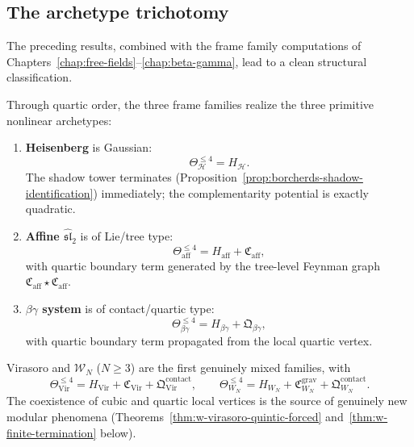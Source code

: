 \subsection{The archetype trichotomy}
\label{subsec:w-archetype-trichotomy}

The preceding results, combined with the frame family computations
of Chapters~\ref{chap:free-fields}--\ref{chap:beta-gamma},
lead to a clean structural classification.

\begin{theorem}
\label{thm:w-archetype-trichotomy}
Through quartic order, the three frame families realize the three
primitive nonlinear archetypes:
\begin{enumerate}[label=\textup{(\roman*)}]
\item \textbf{Heisenberg} is Gaussian:
\[
\Theta_{\mathcal H}^{\le 4}=H_{\mathcal H}.
\]
The shadow tower terminates
(Proposition~\ref{prop:borcherds-shadow-identification}) immediately; the complementarity potential
is exactly quadratic.

\item \textbf{Affine $\widehat{\mathfrak{sl}}_2$} is of Lie/tree type:
\[
\Theta_{\mathrm{aff}}^{\le 4}=H_{\mathrm{aff}}+\mathfrak C_{\mathrm{aff}},
\]
with quartic boundary term generated by the tree-level Feynman graph
$\mathfrak C_{\mathrm{aff}}\star\mathfrak C_{\mathrm{aff}}$.

\item \textbf{$\beta\gamma$ system} is of contact/quartic type:
\[
\Theta_{\beta\gamma}^{\le 4}=H_{\beta\gamma}
+\mathfrak Q_{\beta\gamma},
\]
with quartic boundary term propagated from the local quartic vertex.
\end{enumerate}
Virasoro and $\mathcal{W}_N$ ($N\ge 3$) are the first genuinely mixed
families, with
\[
\Theta_{\mathrm{Vir}}^{\le 4}
=H_{\mathrm{Vir}}+\mathfrak C_{\mathrm{Vir}}
+\mathfrak Q^{\mathrm{contact}}_{\mathrm{Vir}},
\qquad
\Theta_{W_N}^{\le 4}
=H_{W_N}+\mathfrak C^{\mathrm{grav}}_{W_N}
+\mathfrak Q^{\mathrm{contact}}_{W_N}.
\]
The coexistence of cubic and quartic local vertices is the source of
genuinely new modular phenomena (Theorems~\ref{thm:w-virasoro-quintic-forced}
and~\ref{thm:w-finite-termination} below).
\end{theorem}

